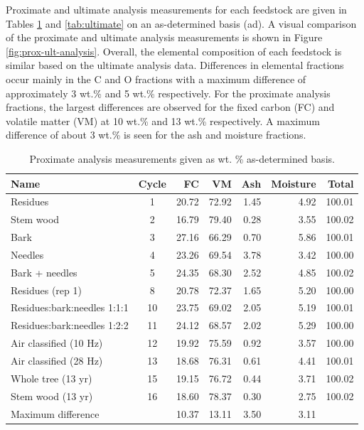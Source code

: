 Proximate and ultimate analysis measurements for each feedstock are given in Tables \ref{tab:proximate} and \ref{tab:ultimate} on an as-determined basis (ad). A visual comparison of the proximate and ultimate analysis measurements is shown in Figure \ref{fig:prox-ult-analysis}. Overall, the elemental composition of each feedstock is similar based on the ultimate analysis data. Differences in elemental fractions occur mainly in the C and O fractions with a maximum difference of approximately 3 wt.\% and 5 wt.\% respectively. For the proximate analysis fractions, the largest differences are observed for the fixed carbon (FC) and volatile matter (VM) at 10 wt.\% and 13 wt.\% respectively. A maximum difference of about 3 wt.\% is seen for the ash and moisture fractions.

\begin{table}[H]
    \caption{Proximate analysis measurements given as wt. \% as-determined basis.}
    \label{tab:proximate}
    \centering
    \begin{tabular}{lcrrrrr}
        \toprule
        Name & Cycle & FC & VM & Ash & Moisture & Total \\
        \midrule
        Residues                    & 1  & 20.72 & 72.92 & 1.45 & 4.92 & 100.01 \\
        Stem wood                   & 2  & 16.79 & 79.40 & 0.28 & 3.55 & 100.02 \\
        Bark                        & 3  & 27.16 & 66.29 & 0.70 & 5.86 & 100.01 \\
        Needles                     & 4  & 23.26 & 69.54 & 3.78 & 3.42 & 100.00 \\
        Bark + needles              & 5  & 24.35 & 68.30 & 2.52 & 4.85 & 100.02 \\
        Residues (rep 1)            & 8  & 20.78 & 72.37 & 1.65 & 5.20 & 100.00 \\
        Residues:bark:needles 1:1:1 & 10 & 23.75 & 69.02 & 2.05 & 5.19 & 100.01 \\
        Residues:bark:needles 1:2:2 & 11 & 24.12 & 68.57 & 2.02 & 5.29 & 100.00 \\
        Air classified (10 Hz)      & 12 & 19.92 & 75.59 & 0.92 & 3.57 & 100.00 \\
        Air classified (28 Hz)      & 13 & 18.68 & 76.31 & 0.61 & 4.41 & 100.01 \\
        Whole tree (13 yr)          & 15 & 19.15 & 76.72 & 0.44 & 3.71 & 100.02 \\
        Stem wood (13 yr)           & 16 & 18.60 & 78.37 & 0.30 & 2.75 & 100.02 \\
        \cmidrule{3-6}
        \multicolumn{2}{l}{Maximum difference} & 10.37 & 13.11 & 3.50 & 3.11 & \\
        \bottomrule
    \end{tabular}
\end{table}

